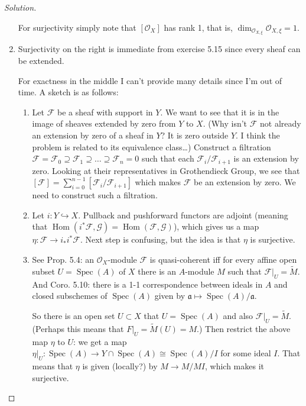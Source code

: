 \begin{proof}[Solution]
\begin{enumerate}[label=\alph*.]
			For surjectivity simply note that $[\mathcal{O}_X]$ has rank 1, that is, $\dim_{\mathcal{O}_{X,\xi}}\mathcal{O}_{X,\xi}=1$.


			\item Surjectivity on the right is immediate from exercise 5.15 since every sheaf can be extended.

				For exactness in the middle I can't provide many details since I'm out of time. A sketch is as follows:
				\begin{enumerate}[label=\textbf{Step \arabic*}]
					\item Let $\mathcal{F}$ be a sheaf with support in $Y$. We want to see that it is in the image of sheaves extended by zero from  $Y$ to $X$. {\color{2}(Why isn't $\mathcal{F}$ not already an extension by zero of a sheaf in $Y$? It is zero outside $Y$. I think the problem is related to its equivalence class…)} Construct a filtration $\mathcal{F}=\mathcal{F}_0\supseteq\mathcal{F}_1\supseteq\ldots \supseteq\mathcal{F}_n=0$ such that each $\mathcal{F}_i/\mathcal{F}_{i+1}$ is an extension by zero. Looking at their representatives in Grothendieck Group, we see that $[\mathcal{F}]=\sum_{i=0}^{n-1}[\mathcal{F}_i/\mathcal{F}_{i+1}]$ which makes $\mathcal{F}$ be an extension by zero. We need to construct such a filtration.

					\item Let $i:Y\hookrightarrow X$. Pullback and pushforward functors are adjoint (meaning that $\operatorname{Hom}(i^*\mathcal{F},\mathcal{G})=\operatorname{Hom}(\mathcal{F},\mathcal{G})$), which gives us a map $\eta:\mathcal{F}\longrightarrow i_* i^*\mathcal{F}$. Next step is confusing, but the idea is that $\eta$ is surjective.

					\item See Prop. 5.4: an $\mathcal{O}_X$-module $\mathcal{F}$ is quasi-coherent iff for every affine open subset $U=\operatorname{Spec}(A)$ of $X$ there is an $A$-module $M$ such that $\mathcal{F}|_{U}=\tilde{M}$. And Coro. 5.10: there is a 1-1 correspondence between ideals in $A$ and closed subschemes of $\operatorname{Spec}(A)$ given by $\mathfrak{a}\mapsto \operatorname{Spec}(A) /\mathfrak{a}$.

						So there is an open set $U\subset X$ that $U=\operatorname{Spec}(A)$ and also $\mathcal{F}|_{U}=\tilde{M}$. ({\color{3}Perhaps this means that $F|_{U}=\tilde{M}(U)=M$.)} Then restrict the above map $\eta$ to  $U$: we get a map  $\eta|_{U}:\operatorname{Spec}(A) \longrightarrow Y\cap \operatorname{Spec}(A) \cong \operatorname{Spec}(A) /I$ for some ideal $I$. That means that $\eta$ is given (locally?) by $M\to M/M I$, which makes it surjective.


\end{enumerate}
\end{enumerate}
\end{proof}
